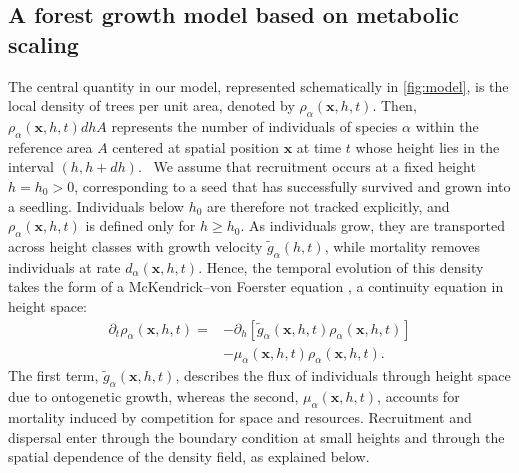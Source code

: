\documentclass[aps,pre,twocolumn,superscriptaddress,10pt]{revtex4-2}
\begin{document}
\subsection*{A forest growth model based on metabolic scaling}
The central quantity in our model, represented schematically in \cref{fig:model}, is the local density of trees per unit area, denoted by $\rho_{\alpha}(\mathbf{x},h,t)$. Then, $\rho_{\alpha}(\mathbf{x},h,t)dh A$ represents the number of individuals of species $\alpha$ within the reference area $A$ centered at spatial position $\mathbf{x}$ at time $t$ whose height lies in the interval $(h,h+dh)$. \
We assume that recruitment occurs at a fixed height $h=h_0>0$, corresponding to a seed that has successfully survived and grown into a seedling. Individuals below $h_0$ are therefore not tracked explicitly, and $\rho_\alpha(\mathbf{x},h,t)$ is defined only for $h\geq h_0$.
As individuals grow, they are transported across height classes with growth velocity $\tilde g_{\alpha}(h,t)$, while mortality removes individuals at rate $d_{\alpha}(\mathbf{x},h,t)$. Hence, the temporal evolution of this density takes the form of a McKendrick–von Foerster equation  \cite{McKendrick_1925,keyfitz1997mckendrick,murray2003mathematical}, a continuity equation in height space:
\begin{equation}
\begin{split}
    \partial_t \rho_{\alpha}(\mathbf{x},h,t) =& - \partial_{h}\left[ \tilde{g}_{\alpha}(\mathbf{x},h,t) \rho_{\alpha}(\mathbf{x},h,t) \right]\\ &- \mu_{\alpha}(\mathbf{x},h,t) \rho_{\alpha}(\mathbf{x},h,t).
\end{split}
\label{eq:model-main}
\end{equation}
The first term, $\tilde{g}_{\alpha}(\mathbf{x},h,t)$, describes the flux of individuals through height space due to ontogenetic growth, whereas the second, $\mu_{\alpha}(\mathbf{x},h,t)$, accounts for mortality induced by competition for space and resources. Recruitment and dispersal enter through the boundary condition at small heights and through the spatial dependence of the density field, as explained below.
\end{document}
